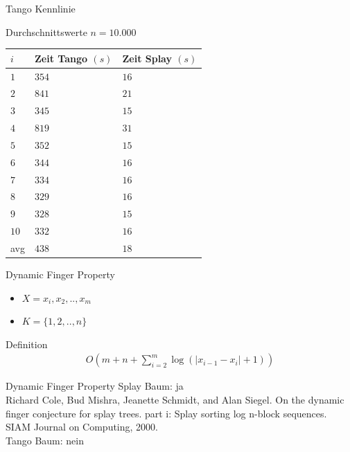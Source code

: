 \documentclass[11pt]{beamer}
\begin{document}
\begin{frame}{Tango Kennlinie}
	\begin{table}
		\begin{center}
			Durchschnittswerte $n = 10.000$
			\begin{tabular}[c]{|l|l|l|}
				\hline
				$i$ & Zeit Tango $\left(s\right)$ &Zeit Splay $\left(s\right)$\\
				\hline
				$1$ & $354$ &$16$ \\
				\hline
				$2$ & $841$ &$21$ \\
				\hline
				$3$ & $345$ &$15$  \\
				\hline
				$4$ & $819$ &$31$ \\
				\hline
				$5$ & $352$ &$15$  \\
				\hline
				$6$ & $344$ &$16$  \\
				\hline		
				$7$ & $334$ &$16$ \\
				\hline
				$8$ & $329$ &$16$ \\
				\hline
				$9$ & $328$ &$15$  \\
				\hline
				$10$ & $332$ &$16$  \\
				\hline
				avg & $438$  & $18$	\\
				\hline
			\end{tabular}
		\end{center}
	\end{table}
\end{frame}


\begin{frame}{Dynamic Finger Property}
	\begin{itemize}
		\item $X = x_i, x_2,.., x_m$
		\item $K = \{1,2,..,n\}$
	\end{itemize}
     \begin{block}{Definition}
     	\begin{align*}
     	O\left( m + n + \sum_{i = 2}^{m} \log \left(\vert x_{i-1} - x_i  \vert	+ 1	\right)\right)
     	\end{align*} 
     \end{block}
\end{frame}

\begin{frame}{Dynamic Finger Property}
	Splay Baum: ja \\
	Richard Cole, Bud Mishra, Jeanette Schmidt, and Alan Siegel. On the
	dynamic finger conjecture for splay trees. part i: Splay sorting log n-block
	sequences. SIAM Journal on Computing,  2000.\\
	\bigskip
	\bigskip
	Tango Baum: nein
	
	
\end{frame}
\end{document}
